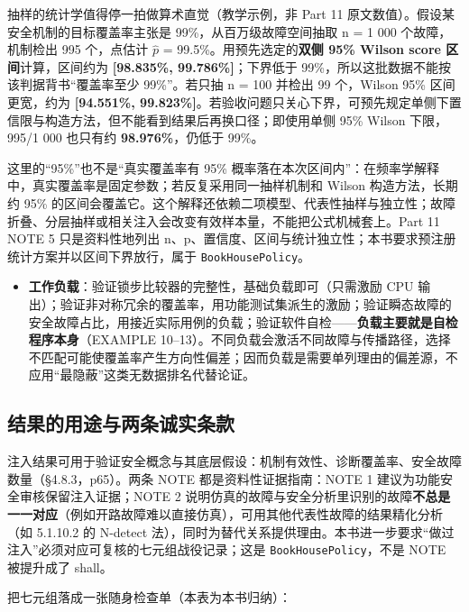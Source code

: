 抽样的统计学值得停一拍做算术直觉（教学示例，非 Part 11 原文数值）。假设某安全机制的目标覆盖率主张是 99\%，从百万级故障空间抽取 n = 1 000 个故障，机制检出 995 个，点估计 \(\hat{p}\) = 99.5\%。用预先选定的\textbf{双侧 95\% Wilson score 区间}计算，区间约为 \textbf{[98.835\%, 99.786\%]}；下界低于 99\%，所以这批数据不能按该判据背书“覆盖率至少 99\%”。若只抽 n = 100 并检出 99 个，Wilson 95\% 区间更宽，约为 \textbf{[94.551\%, 99.823\%]}。若验收问题只关心下界，可预先规定单侧下置信限与构造方法，但不能看到结果后再换口径；即使用单侧 95\% Wilson 下限，995/1 000 也只有约 \textbf{98.976\%}，仍低于 99\%。

这里的“95\%”也不是“真实覆盖率有 95\% 概率落在本次区间内”：在频率学解释中，真实覆盖率是固定参数；若反复采用同一抽样机制和 Wilson 构造方法，长期约 95\% 的区间会覆盖它。这个解释还依赖二项模型、代表性抽样与独立性；故障折叠、分层抽样或相关注入会改变有效样本量，不能把公式机械套上。Part 11 NOTE 5 只是资料性地列出 n、p、置信度、区间与统计独立性；本书要求预注册统计方案并以区间下界放行，属于 \nolinkurl{BookHousePolicy}。
\begin{itemize}
\item \textbf{工作负载}：验证锁步比较器的完整性，基础负载即可（只需激励 CPU 输出）；验证非对称冗余的覆盖率，用功能测试集派生的激励；验证瞬态故障的安全故障占比，用接近实际用例的负载；验证软件自检——\textbf{负载主要就是自检程序本身}（EXAMPLE 10–13）。不同负载会激活不同故障与传播路径，选择不匹配可能使覆盖率产生方向性偏差；因而负载是需要单列理由的偏差源，不应用“最隐蔽”这类无数据排名代替论证。
\end{itemize}

\subsection{结果的用途与两条诚实条款}

注入结果可用于验证安全概念与其底层假设：机制有效性、诊断覆盖率、安全故障数量（§4.8.3，p65）。两条 NOTE 都是资料性证据指南：NOTE 1 建议为功能安全审核保留注入证据；NOTE 2 说明仿真的故障与安全分析里识别的故障\textbf{不总是一一对应}（例如开路故障难以直接仿真），可用其他代表性故障的结果精化分析（如 5.1.10.2 的 N-detect 法），同时为替代关系提供理由。本书进一步要求“做过注入”必须对应可复核的七元组战役记录；这是 \nolinkurl{BookHousePolicy}，不是 NOTE 被提升成了 shall。

把七元组落成一张随身检查单（本表为本书归纳）：

